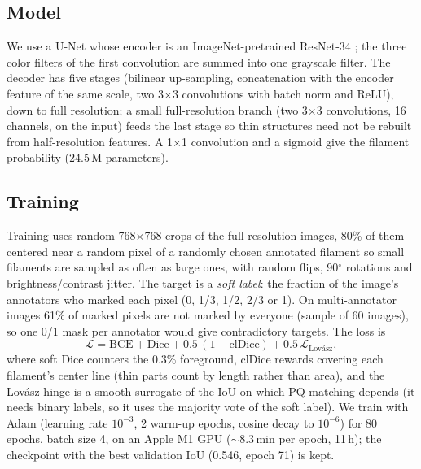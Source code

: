 \documentclass[sigconf]{acmart}
\begin{document}
\subsection{Model}
    We use a U-Net \cite{ronneberger2015unet} whose encoder is an ImageNet-pretrained ResNet-34 \cite{he2016resnet}; the three color filters of the first convolution are summed into one grayscale filter. The decoder has five stages (bilinear up-sampling, concatenation with the encoder feature of the same scale, two 3$\times$3 convolutions with batch norm and ReLU), down to full resolution; a small full-resolution branch (two 3$\times$3 convolutions, 16 channels, on the input) feeds the last stage so thin structures need not be rebuilt from half-resolution features. A 1$\times$1 convolution and a sigmoid give the filament probability (24.5\,M parameters).

\subsection{Training}
    Training uses random 768$\times$768 crops of the full-resolution images, 80\% of them centered near a random pixel of a randomly chosen annotated filament so small filaments are sampled as often as large ones, with random flips, 90$^\circ$ rotations and brightness/contrast jitter. The target is a \emph{soft label}: the fraction of the image's annotators who marked each pixel (0, 1/3, 1/2, 2/3 or 1). On multi-annotator images 61\% of marked pixels are not marked by everyone (sample of 60 images), so one 0/1 mask per annotator would give contradictory targets. The loss is
    \[ \mathcal{L} = \mathrm{BCE} + \mathrm{Dice} + 0.5\,(1-\mathrm{clDice}) + 0.5\,\mathcal{L}_{\text{Lovász}}, \]
    where soft Dice counters the 0.3\% foreground, clDice \cite{shit2021cldice} rewards covering each filament's center line (thin parts count by length rather than area), and the Lovász hinge \cite{berman2018lovasz} is a smooth surrogate of the IoU on which PQ matching depends (it needs binary labels, so it uses the majority vote of the soft label). We train with Adam (learning rate $10^{-3}$, 2 warm-up epochs, cosine decay to $10^{-6}$) for 80 epochs, batch size 4, on an Apple M1 GPU ($\sim$8.3\,min per epoch, 11\,h); the checkpoint with the best validation IoU (0.546, epoch 71) is kept.
\end{document}
